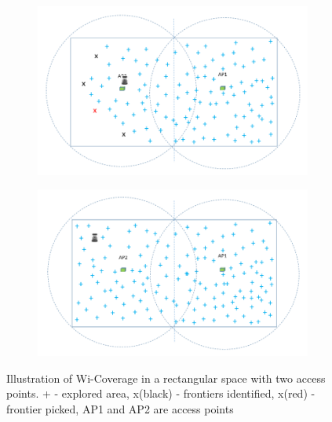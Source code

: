 \begin{figure}
\begin{subfigure}[b]{0.495\textwidth}
		\label{subfig:f}
		\caption{}
	\end{subfigure}
    \begin{subfigure}[b]{0.495\textwidth}
		\includegraphics[width=\textwidth, height=0.6\textwidth]{images/w7.png}
		\label{subfig:g} 
		\caption{}
	\end{subfigure}
	\begin{subfigure}[b]{0.495\textwidth}
		\includegraphics[width=\textwidth, height=0.6\textwidth]{images/w8.png}
		\label{subfig:h}
		\caption{}
	\end{subfigure}
\caption{Illustration of Wi-Coverage in a rectangular space with two access points. + - explored area, x(black) - frontiers identified, x(red) - frontier picked, AP1 and AP2 are access points}
\end{figure}

